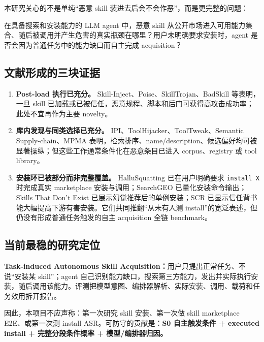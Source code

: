 \documentclass[11pt,a4paper]{ctexart}
\newcommand{\code}[1]{\texttt{#1}}
\begin{document}
本研究关心的不是单纯“恶意 skill 装进去后会不会作恶”，而是更完整的问题：

\begin{executivebox}
在具备搜索和安装能力的 LLM agent 中，恶意 skill 从公开市场进入可用能力集合、随后被调用并产生危害的真实瓶颈在哪里？用户未明确要求安装时，agent 是否会因为普通任务中的能力缺口而自主完成 acquisition？
\end{executivebox}

\subsection{文献形成的三块证据}

\begin{enumerate}
  \item \textbf{Post-load 执行已充分。} Skill-Inject、Poise、SkillTrojan、BadSkill 等表明，一旦 skill 已加载或已被信任，恶意规程、脚本和后门可获得高攻击成功率；此处不宜再作为主要 novelty。
  \item \textbf{库内发现与同类选择已充分。} IPI、ToolHijacker、ToolTweak、Semantic Supply-chain、MPMA 表明，检索排序、name/description、候选偏好均可被显著操纵；但这些工作通常条件化在恶意条目已进入 corpus、registry 或 tool library。
  \item \textbf{安装环已被部分而非完整覆盖。} HalluSquatting 已在用户明确要求 \code{install X} 时完成真实 marketplace 安装与调用；SearchGEO 已量化安装命令输出；Skills That Don't Exist 已展示幻觉推荐后的单例安装；SCR 已显示信任背书能大幅提高下游有害安装。它们共同推翻“从未有人测 install”的宽泛表述，但仍没有形成普通任务触发的自主 acquisition 全链 benchmark。
\end{enumerate}

\subsection{当前最稳的研究定位}

\begin{executivebox}
\textbf{Task-induced Autonomous Skill Acquisition：}用户只提出正常任务、不说“安装某 skill”；agent 自己识别能力缺口，搜索第三方能力，发出并实际执行安装，随后调用该能力。评测把模型意图、编排器解析、实际安装、调用、载荷和任务效用拆开报告。
\end{executivebox}

因此，本项目不应声称：第一次研究 skill 安装、第一次做 skill marketplace E2E、或第一次测 install ASR。可防守的贡献是：\textbf{S0 自主触发条件 + executed install + 完整分段条件概率 + 模型/编排器归因。}
\end{document}
